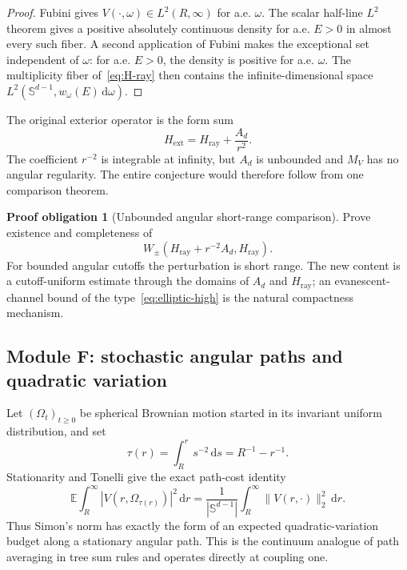 \documentclass[11pt]{article}
\newcommand{\Sd}{\mathbb S^{d-1}}
\newcommand{\dd}{\,\mathrm d}
\theoremstyle{definition}
\newtheorem{problem}[theorem]{Proof obligation}
\theoremstyle{remark}
\begin{document}
\begin{proof}
Fubini gives $V(\cdot,\omega)\in L^2(R,\infty)$ for a.e. $\omega$.  The scalar half-line $L^2$ theorem gives a positive absolutely continuous density for a.e. $E>0$ in almost every such fiber.  A second application of Fubini makes the exceptional set independent of $\omega$: for a.e. $E>0$, the density is positive for a.e. $\omega$.  The multiplicity fiber of~\eqref{eq:H-ray} then contains the infinite-dimensional space $L^2(\Sd,w_\omega(E)\dd\omega)$.
\end{proof}

The original exterior operator is the form sum
\begin{equation}
 H_{\mathrm{ext}}=H_{\mathrm{ray}}+\frac{A_d}{r^2}.
 \label{eq:ray-comparison}
\end{equation}
The coefficient $r^{-2}$ is integrable at infinity, but $A_d$ is unbounded and $M_V$ has no angular regularity.  The entire conjecture would therefore follow from one comparison theorem.

\begin{problem}[Unbounded angular short-range comparison]\label{prob:raywise-wave}
Prove existence and completeness of
\begin{equation}
 W_\pm\!\left(H_{\mathrm{ray}}+r^{-2}A_d,H_{\mathrm{ray}}\right).
 \label{eq:ray-wave}
\end{equation}
For bounded angular cutoffs the perturbation is short range.  The new content is a cutoff-uniform estimate through the domains of $A_d$ and $H_{\mathrm{ray}}$; an evanescent-channel bound of the type~\eqref{eq:elliptic-high} is the natural compactness mechanism.
\end{problem}

\subsection{Module F: stochastic angular paths and quadratic variation}

Let $(\Omega_t)_{t\geq0}$ be spherical Brownian motion started in its invariant uniform distribution, and set
\begin{equation}
 \tau(r)=\int_R^r s^{-2}\dd s=R^{-1}-r^{-1}.
 \label{eq:angular-time}
\end{equation}
Stationarity and Tonelli give the exact path-cost identity
\begin{equation}
 \mathbb E\int_R^\infty
 |V(r,\Omega_{\tau(r)})|^2\dd r
 =\frac1{|\Sd|}
  \int_R^\infty\|V(r,\cdot)\|_2^2\dd r.
 \label{eq:path-cost}
\end{equation}
Thus Simon's norm has exactly the form of an expected quadratic-variation budget along a stationary angular path.  This is the continuum analogue of path averaging in tree sum rules and operates directly at coupling one.
\end{document}
